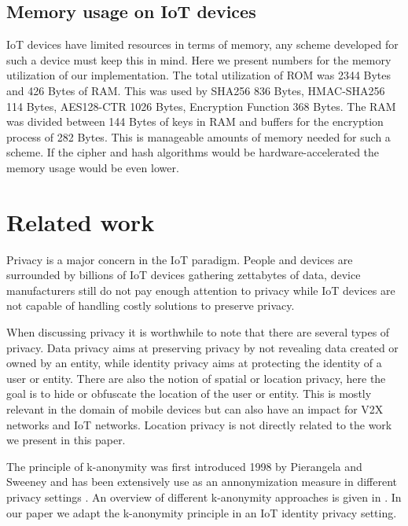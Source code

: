 {\subsection{Memory usage on IoT devices}
IoT devices have limited resources in terms of memory, any scheme developed for such a device must keep this in mind. Here we present numbers for the memory utilization of our implementation. The total utilization of ROM was 2344 Bytes and 426 Bytes of RAM. This was used by SHA256 836 Bytes, HMAC-SHA256 114 Bytes, AES128-CTR 1026 Bytes, Encryption Function 368 Bytes. The RAM was divided between 144 Bytes of keys in RAM and buffers for the encryption process of 282 Bytes. This is manageable amounts of memory needed for such a scheme. If the cipher and hash algorithms would be hardware-accelerated the memory usage would be even lower.


\section{Related work}
\label{relatedwork}
Privacy is a major concern in the IoT paradigm\cite{perera2015big}. People and devices are surrounded by billions of IoT devices gathering zettabytes of data, device manufacturers still do not pay enough attention to privacy while IoT devices are not capable of handling costly solutions to preserve privacy. 


When discussing privacy it is worthwhile to note that there are several types of privacy\cite{porambage2016quest}. Data privacy aims at preserving privacy by not revealing data created or owned by an entity, while identity privacy aims at protecting the identity of a user or entity. There are also the notion of spatial or location privacy, here the goal is to hide or obfuscate the location of the user or entity. This is mostly relevant in the domain of mobile devices\cite{chen2017robustness}  but can also have an impact for V2X networks and IoT networks. Location privacy is not directly related to the work we present in this paper. 

The principle of k-anonymity was first introduced 1998 by  Pierangela and Sweeney and has been extensively use as an annonymization measure in different privacy settings \cite{Sweeney2002}. An overview of different k-anonymity approaches is given in \cite{Ayala2014}. In our paper we adapt the k-anonymity principle in an IoT identity privacy setting.

}
